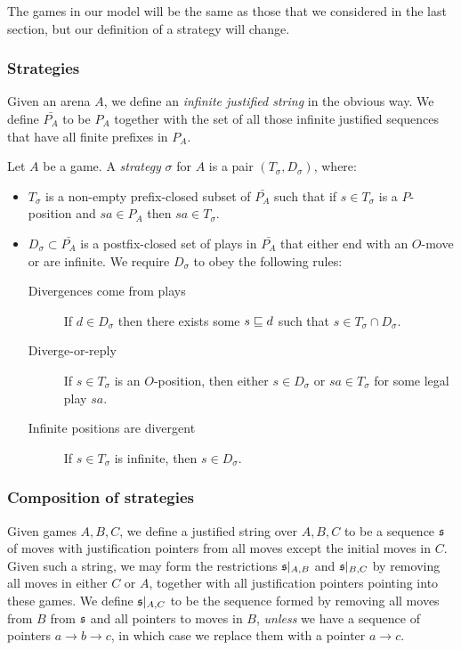 \documentclass[sigplan,10pt,review]{acmart}\settopmatter{printfolios=true,printccs=false,printacmref=false}
\begin{document}
The games in our model will be the same as those that we considered in the last section, but our definition of a strategy will change.

\subsubsection{Strategies}

Given an arena $A$, we define an \emph{infinite justified string} in the obvious way.  
We define $\bar{P_A}$ to be $P_A$ together with the set of all those infinite justified sequences that have all finite prefixes in $P_A$.

Let $A$ be a game.  
A \emph{strategy} $\sigma$ for $A$ is a pair $(T_\sigma,D_\sigma)$, where:
\begin{itemize}
  \item $T_\sigma$ is a non-empty prefix-closed subset of $\bar{P_A}$ such that if $s\in T_\sigma$ is a $P$-position and $sa\in P_A$ then $sa\in T_\sigma$.
  \item $D_\sigma\subset \bar{P_A}$ is a postfix-closed set of plays in $\bar{P_A}$ that either end with an $O$-move or are infinite.  
    We require $D_\sigma$ to obey the following rules:
    \begin{description}
      \item[Divergences come from plays] If $d\in D_\sigma$ then there exists some $s\sqsubseteq d$ such that $s\in T_\sigma\cap D_\sigma$.
      \item[Diverge-or-reply] If $s\in T_\sigma$ is an $O$-position, then either $s\in D_\sigma$ or $sa\in T_\sigma$ for some legal play $sa$.
      \item[Infinite positions are divergent] If $s\in T_\sigma$ is infinite, then $s\in D_\sigma$.
    \end{description}
\end{itemize}

\subsubsection{Composition of strategies}

Given games $A,B,C$, we define a justified string over $A,B,C$ to be a sequence $\mathfrak s$ of moves with justification pointers from all moves except the initial moves in $C$.  
Given such a string, we may form the restrictions $\mathfrak s\vert_{A,B}$ and $\mathfrak s\vert_{B,C}$ by removing all moves in either $C$ or $A$, together with all justification pointers pointing into these games.  
We define $\mathfrak s\vert_{A,C}$ to be the sequence formed by removing all moves from $B$ from $\mathfrak s$ and all pointers to moves in $B$, \emph{unless} we have a sequence of pointers $a \to b \to c$, in which case we replace them with a pointer $a \to c$.
\end{document}
